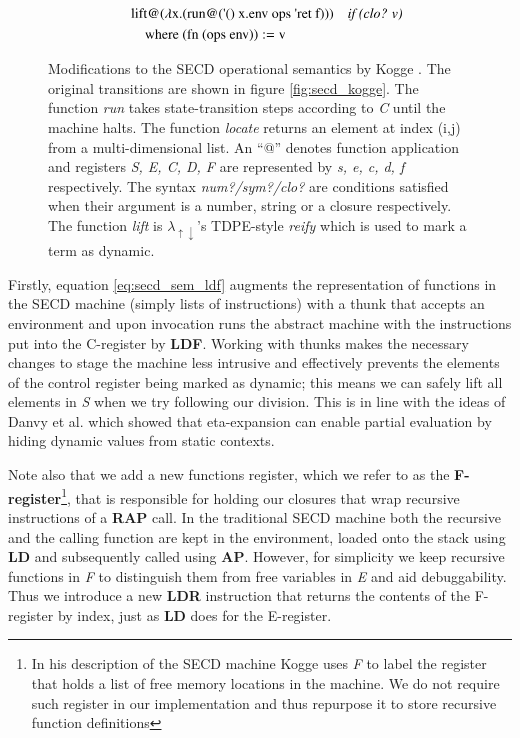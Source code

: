 \documentclass[a4paper,12pt,twoside,openright]{report}
\theoremstyle{definition}
\newcommand{\ts}{\textquotesingle}
\newcommand{\mslang}{$\lambda_{\uparrow\downarrow}$}
\begin{document}
\begin{figure}[htp!]
\begin{alignat}{5}
		 & && \text{lift@($\lambda$x.(run@({\ts}() x.env ops {\ts}ret f)))} \quad\text{\textit{if (clo? v)}} \nonumber \\
		 & && \quad \text{where (fn (ops env))}:= \text{v} \nonumber
\end{alignat}
\caption{Modifications to the SECD operational semantics by Kogge \cite{kogge1990architecture}. The original transitions are shown in figure \ref{fig:secd_kogge}. The function \textit{run} takes state-transition steps according to \textit{C} until the machine halts. The function \textit{locate} returns an element at index (i,j) from a multi-dimensional list. An ``@'' denotes function application and registers \textit{S, E, C, D, F} are represented by \textit{s, e, c, d, f} respectively. The syntax \textit{num?/sym?/clo?} are conditions satisfied when their argument is a number, string or a closure respectively. The function \textit{lift} is \mslang's TDPE-style \textit{reify} which is used to mark a term as dynamic.}
\label{fig:secd_semantics_noset}
\end{figure}
\endgroup
\newpage

Firstly, equation \ref{eq:secd_sem_ldf} augments the representation of functions in the SECD machine (simply lists of instructions) with a thunk that accepts an environment and upon invocation runs the abstract machine with the instructions put into the C-register by \textbf{LDF}. Working with thunks makes the necessary changes to stage the machine less intrusive and effectively prevents the elements of the control register being marked as dynamic; this means we can safely lift all elements in \textit{S} when we try following our division. This is in line with the ideas of Danvy et al. \cite{danvy1995essence} which showed that eta-expansion can enable partial evaluation by hiding dynamic values from static contexts.

Note also that we add a new functions register, which we refer to as the \textbf{F-register}\footnote{In his description of the SECD machine Kogge \cite{kogge1990architecture} uses \textit{F} to label the register that holds a list of free memory locations in the machine. We do not require such register in our implementation and thus repurpose it to store recursive function definitions}, that is responsible for holding our closures that wrap recursive instructions of a \textbf{RAP} call. In the traditional SECD machine both the recursive and the calling function are kept in the environment, loaded onto the stack using \textbf{LD} and subsequently called using \textbf{AP}. However, for simplicity we keep recursive functions in \textit{F} to distinguish them from free variables in \textit{E} and aid debuggability. Thus we introduce a new \textbf{LDR} instruction that returns the contents of the F-register by index, just as \textbf{LD} does for the E-register.
\end{document}
